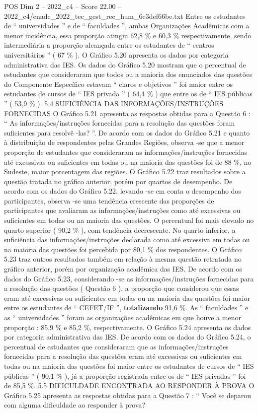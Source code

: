 \begin{textsample}{POS Dim 2 – 2022\_c4 – Score 22.00 – 2022\_c4/enade\_2022\_tec\_gest\_rec\_hum\_6c3def66be.txt}
Entre os estudantes de “ universidades ” e de “ faculdades ”, ambas Organizações Acadêmicas com a menor incidência, essa proporção atingiu 62,8 \% e 60,3 \% respectivamente, sendo intermediária a proporção alcançada entre os estudantes de “ centros universitários ” ( 67 \% ).
O Gráfico 5.20 apresenta os dados por categoria administrativa das IES.
Os dados do Gráfico 5.20 mostram que o percentual de estudantes que consideraram que todos ou a maioria dos enunciados das questões do Componente Específico estavam “ claros e objetivos ” foi maior entre os estudantes de cursos de “ IES privada ” ( 64,4 \% ) que entre os de “ IES públicas ” ( 53,9 \% ). 5.4 SUFICIÊNCIA DAS INFORMAÇÕES/INSTRUÇÕES FORNECIDAS O Gráfico 5.21 apresenta as respostas obtidas para a Questão 6 : “ As informações/instruções fornecidas para a resolução das questões foram suficientes para resolvê -las? ”.
De acordo com os dados do Gráfico 5.21 e quanto à distribuição de respondentes pelas Grandes Regiões, observa -se que a menor proporção de estudantes que consideraram as informações/instruções fornecidas até excessivas ou suficientes em todas ou na maioria das questões foi de 88 \%, no Sudeste, maior porcentagem das regiões.
O Gráfico 5.22 traz resultados sobre a questão tratada no gráfico anterior, porém por quartos de desempenho.
De acordo com os dados do Gráfico 5.22, levando -se em conta o desempenho dos participantes, observa -se uma tendência crescente das proporções de participantes que avaliaram as informações/instruções como até excessivas ou suficientes em todas ou na maioria das questões.
O percentual foi mais elevado no quarto superior ( 90,2 \% ), com tendência decrescente.
No quarto inferior, a suficiência das informações/instruções declarada como até excessiva em todas ou na maioria das questões foi percebida por 80,1 \% dos respondentes.
O Gráfico 5.23 traz outros resultados também em relação à mesma questão retratada no gráfico anterior, porém por organização acadêmica das IES.
De acordo com os dados do Gráfico 5.23, considerando -se as informações/instruções fornecidas para a resolução das questões ( Questão 6 ), a proporção que considerou que essas eram até excessivas ou suficientes em todas ou na maioria das questões foi maior entre os estudantes de “ CEFET/IF ”, \textbf{totalizando} 91,6 \%.
As “ faculdades ” e as “ universidades ” foram as organizações acadêmicas em que houve a menor proporção : 85,9 \% e 85,2 \%, respectivamente.
O Gráfico 5.24 apresenta os dados por categoria administrativa das IES.
De acordo com os dados do Gráfico 5.24, o percentual de estudantes que consideraram que as informações/instruções fornecidas para a resolução das questões eram até excessivas ou suficientes em todas ou na maioria das questões foi maior entre os estudantes de cursos de “ IES públicas ” ( 90,1 \% ), já a proporção registrada entre os de “ IES privadas ” foi de 85,5 \%. 5.5 DIFICULDADE ENCONTRADA AO RESPONDER À PROVA O Gráfico 5.25 apresenta as respostas obtidas para a Questão 7 : “ Você se deparou com alguma dificuldade ao responder à prova?

\end{textsample}
